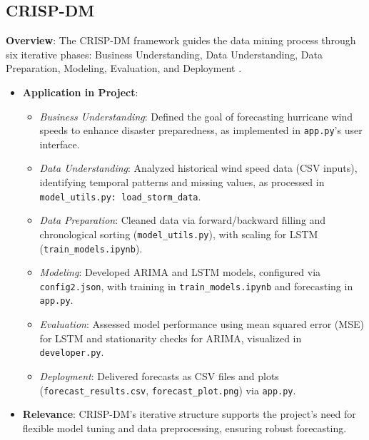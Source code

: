 \subsection{CRISP-DM}
\textbf{Overview}: The CRISP-DM framework guides the data mining process through six iterative phases: Business Understanding, Data Understanding, Data Preparation, Modeling, Evaluation, and Deployment \cite{ChapmanEtAl2000}. 
\begin{itemize}
	\item \textbf{Application in Project}: 
	\begin{itemize}
		\item \textit{Business Understanding}: Defined the goal of forecasting hurricane wind speeds to enhance disaster preparedness, as implemented in \texttt{app.py}'s user interface.
		\item \textit{Data Understanding}: Analyzed historical wind speed data (CSV inputs), identifying temporal patterns and missing values, as processed in \texttt{model\_utils.py: load\_storm\_data}.
		\item \textit{Data Preparation}: Cleaned data via forward/backward filling and chronological sorting (\texttt{model\_utils.py}), with scaling for LSTM (\texttt{train\_models.ipynb}).
		\item \textit{Modeling}: Developed ARIMA and LSTM models, configured via \texttt{config2.json}, with training in \texttt{train\_models.ipynb} and forecasting in \texttt{app.py}.
		\item \textit{Evaluation}: Assessed model performance using mean squared error (MSE) for LSTM and stationarity checks for ARIMA, visualized in \texttt{developer.py}.
		\item \textit{Deployment}: Delivered forecasts as CSV files and plots (\texttt{forecast\_results.csv}, \texttt{forecast\_plot.png}) via \texttt{app.py}.
	\end{itemize}
	\item \textbf{Relevance}: CRISP-DM's iterative structure supports the project's need for flexible model tuning and data preprocessing, ensuring robust forecasting.
\end{itemize}

